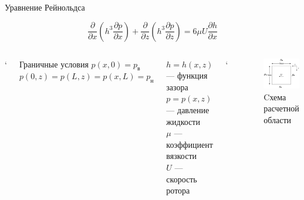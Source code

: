 \documentclass[ignoreonframetext,unicode]{beamer}
\begin{document}
	\begin{frame}{Уравнение Рейнольдса}
		
		\begin{block}{}
			\[
			\frac{\partial}{\partial x} \left(h^3 \frac{\partial p}{\partial x} \right) + \frac{\partial}{\partial z} \left(h^{3} \frac{\partial p}{\partial z} \right) = 6 \mu U \frac{\partial h}{\partial x}
			\]
		\end{block}
		
		\vspace*{-10mm}
		\begin{columns}
	
		`
			\begin{block}{Граничные условия}
				$p(x, 0) = p_{\text{в}}$\\ 
				$p(0, z) = p(L, z) = p(x, L) = p_{\text{н}}$
			\end{block}
			\begin{block}{}
			$h = h(x, z)$ --- функция зазора \\
			$p = p(x, z)$ --- давление жидкости \\
			$\mu$ --- коэффициент вязкости \\
			$U$ --- скорость ротора
			\end{block}

	
	`
	\begin{figure}[!htbp]
	\centering
	\includegraphics[width=1\textwidth, height=0.5\textheight]{taskGU}%
	\caption{Cхема расчетной области}
	\vspace*{-2mm}
	\label{ser_graph}
\end{figure}

		\end{columns}
		
		
		
	\end{frame}	
\end{document}
